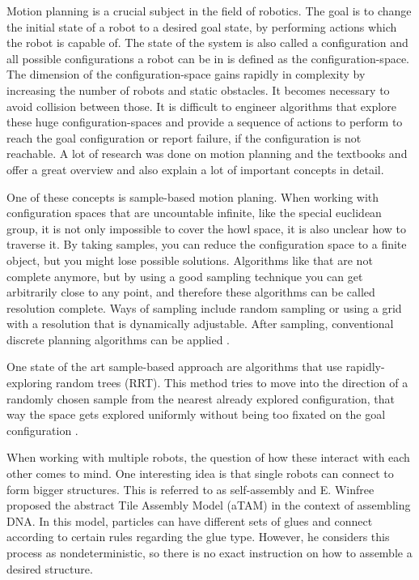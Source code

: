 Motion planning is a crucial subject in the field of robotics.
The goal is to change the initial state of a robot to a desired goal state, by performing actions which the robot is capable of.
The state of the system is also called a configuration and all possible configurations a robot can be in is defined as the configuration-space.
The dimension of the configuration-space gains rapidly in complexity by increasing the number of robots and static obstacles.
It becomes necessary to avoid collision between those.
It is difficult to engineer algorithms that explore these huge configuration-spaces and provide a sequence of actions to perform to reach the goal configuration or report failure, if the configuration is not reachable.
A lot of research was done on motion planning and the textbooks \cite{LaValle2006} and \cite{Mueller2019} offer a great overview and also explain a lot of important concepts in detail.

One of these concepts is sample-based motion planing.
When working with configuration spaces that are uncountable infinite, like the special euclidean group, it is not only impossible to cover the howl space, it is also unclear how to traverse it.
By taking samples, you can reduce the configuration space to a finite object, but you might lose possible solutions.
Algorithms like that are not complete anymore, but by using a good sampling technique you can get arbitrarily close to any point, and therefore these algorithms can be called resolution complete.
Ways of sampling include random sampling or using a grid with a resolution that is dynamically adjustable.
After sampling, conventional discrete planning algorithms can be applied \cite{LaValle2006}.

One state of the art sample-based approach are algorithms that use rapidly-exploring random trees (RRT).
This method tries to move into the direction of a randomly chosen sample from the nearest already explored configuration, that way the space gets explored uniformly without being too fixated on the goal configuration \cite{lavalle1998,lavalle2001}.

When working with multiple robots, the question of how these interact with each other comes to mind.
One interesting idea is that single robots can connect to form bigger structures.
This is referred to as self-assembly and E. Winfree \cite{winfree1998} proposed the abstract Tile Assembly Model (aTAM) in the context of assembling DNA.
In this model, particles can have different sets of glues and connect according to certain rules regarding the glue type.
However, he considers this process as nondeterministic, so there is no exact instruction on how to assemble a desired structure.

